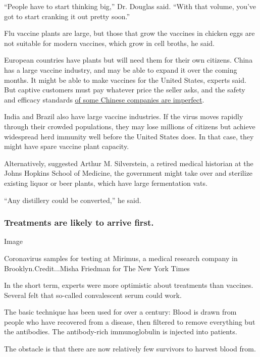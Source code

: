 ``People have to start thinking big,'' Dr. Douglas said. ``With that
volume, you've got to start cranking it out pretty soon.''

Flu vaccine plants are large, but those that grow the vaccines in
chicken eggs are not suitable for modern vaccines, which grow in cell
broths, he said.

European countries have plants but will need them for their own
citizens. China has a large vaccine industry, and may be able to expand
it over the coming months. It might be able to make vaccines for the
United States, experts said. But captive customers must pay whatever
price the seller asks, and the safety and efficacy standards
\href{https://www.nytimes3xbfgragh.onion/2020/04/16/world/europe/coronavirus-antibody-test-uk.html}{of
some Chinese companies are imperfect}.

India and Brazil also have large vaccine industries. If the virus moves
rapidly through their crowded populations, they may lose millions of
citizens but achieve widespread herd immunity well before the United
States does. In that case, they might have spare vaccine plant capacity.

Alternatively, suggested Arthur M. Silverstein, a retired medical
historian at the Johns Hopkins School of Medicine, the government might
take over and sterilize existing liquor or beer plants, which have large
fermentation vats.

``Any distillery could be converted,'' he said.

\hypertarget{treatments-are-likely-to-arrive-first}{%
\subsubsection{Treatments are likely to arrive
first.}\label{treatments-are-likely-to-arrive-first}}

Image

Coronavirus samples for testing at Mirimus, a medical research company
in Brooklyn.Credit...Misha Friedman for The New York Times

In the short term, experts were more optimistic about treatments than
vaccines. Several felt that so-called convalescent serum could work.

The basic technique has been used for over a century: Blood is drawn
from people who have recovered from a disease, then filtered to remove
everything but the antibodies. The antibody-rich immunoglobulin is
injected into patients.

The obstacle is that there are now relatively few survivors to harvest
blood from.

